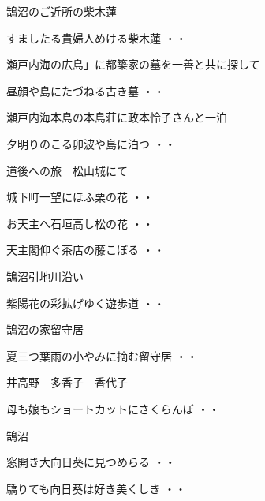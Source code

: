 \vspace{0.6cm}
\noindent
鵠沼のご近所の柴木蓮
\begin{shiika}すましたる貴婦人めける柴木蓮
\hfill{・・}\end{shiika}
\vspace{0.6cm}
瀬戸内海の広島」に都築家の墓を一善と共に探して
\begin{shiika}昼顔や島にたづねる古き墓
\hfill{・・}\end{shiika}
\vspace{0.6cm}
瀬戸内海本島の本島荘に政本怜子さんと一泊
\begin{shiika}夕明りのこる卯波や島に泊つ
\hfill{・・}\end{shiika}
\vspace{0.6cm}
道後への旅　松山城にて
\begin{shiika}城下町一望にほふ栗の花
\hfill{・・}\end{shiika}
\begin{shiika}お天主へ石垣高し松の花
\hfill{・・}\end{shiika}
\begin{shiika}天主閣仰ぐ茶店の藤こぼる
\hfill{・・}\end{shiika}
\vspace{0.6cm}
鵠沼引地川沿い
\begin{shiika}紫陽花の彩拡げゆく遊歩道
\hfill{・・}\end{shiika}
\vspace{0.6cm}
鵠沼の家留守居
\begin{shiika}夏三つ葉雨の小やみに摘む留守居
\hfill{・・}\end{shiika}
\vspace{0.6cm}
井高野　多香子　香代子
\begin{shiika}母も娘もショートカットにさくらんぼ
\hfill{・・}\end{shiika}
\vspace{0.6cm}
鵠沼
\begin{shiika}窓開き大向日葵に見つめらる
\hfill{・・}\end{shiika}
\begin{shiika}驕りても向日葵は好き美くしき
\hfill{・・}\end{shiika}

